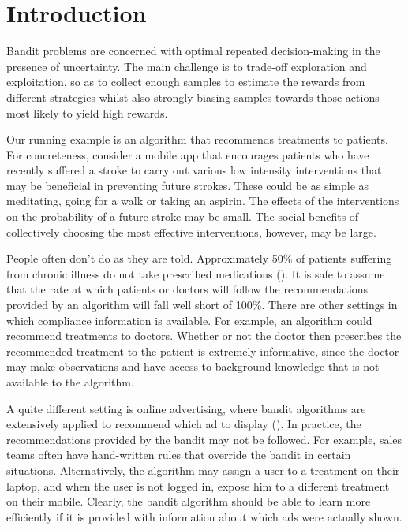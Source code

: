 \section{Introduction}
\label{bandintro}

Bandit problems are concerned with optimal repeated decision-making in the presence of uncertainty. The main challenge is to trade-off exploration and exploitation, so as to collect enough samples to estimate the rewards from different strategies whilst also strongly biasing samples towards those actions most likely to yield high rewards.

Our running example is an algorithm that recommends treatments to patients. For concreteness, consider a mobile app that encourages patients who have recently suffered a stroke to carry out various low intensity interventions that may be beneficial in preventing future strokes.
These could be as simple as meditating, going for a walk or taking an aspirin.
The effects of the interventions on the probability of a future stroke may be small. The social benefits of collectively choosing the most effective interventions, however, may be large.

People often don't do as they are told. Approximately 50\% of patients suffering from chronic illness do not take prescribed medications (\cite{sabate:03}). It is safe to assume that the rate at which patients or doctors will follow the recommendations provided by an algorithm will fall well short of 100\%. 
There are other settings in which compliance information is available. For example, an algorithm could recommend treatments to doctors. Whether or not the doctor then prescribes the recommended treatment to the patient is extremely informative, since the doctor may make observations and have access to background knowledge that is not available to the algorithm.


A quite different setting is online advertising, where bandit algorithms are extensively applied to recommend which ad to display (\cite{graepel:10,mcmahan:13}). In practice, the recommendations provided by the bandit may not be followed. For example, sales teams often have hand-written rules that override the bandit in certain situations. Alternatively, the algorithm may assign a user to a treatment on their laptop, and when the user is not logged in, expose him to a different treatment on their mobile.
Clearly, the bandit algorithm should be able to learn more efficiently if it is provided  with information about which ads were actually shown.

